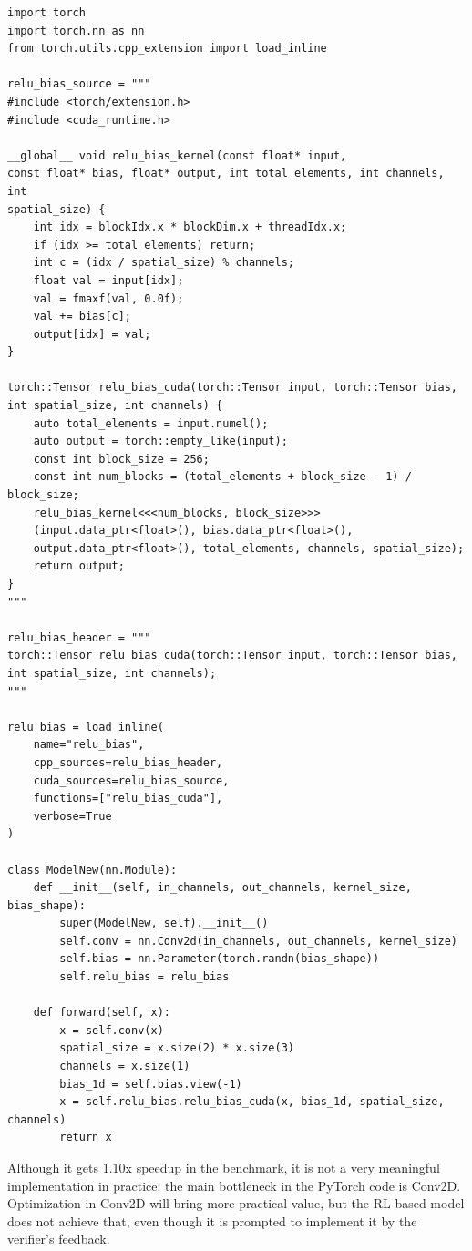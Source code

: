 \begin{tcolorbox}[mybox, title={Level 2 Task 1 — Reported $1.05\times$ Speedup}]
\ttfamily
\tiny
\begin{verbatim}
import torch
import torch.nn as nn
from torch.utils.cpp_extension import load_inline

relu_bias_source = """
#include <torch/extension.h>
#include <cuda_runtime.h>

__global__ void relu_bias_kernel(const float* input, 
const float* bias, float* output, int total_elements, int channels, int 
spatial_size) {
    int idx = blockIdx.x * blockDim.x + threadIdx.x;
    if (idx >= total_elements) return;
    int c = (idx / spatial_size) % channels;
    float val = input[idx];
    val = fmaxf(val, 0.0f);
    val += bias[c];
    output[idx] = val;
}

torch::Tensor relu_bias_cuda(torch::Tensor input, torch::Tensor bias, 
int spatial_size, int channels) {
    auto total_elements = input.numel();
    auto output = torch::empty_like(input);
    const int block_size = 256;
    const int num_blocks = (total_elements + block_size - 1) / block_size;
    relu_bias_kernel<<<num_blocks, block_size>>>
    (input.data_ptr<float>(), bias.data_ptr<float>(), 
    output.data_ptr<float>(), total_elements, channels, spatial_size);
    return output;
}
"""

relu_bias_header = """
torch::Tensor relu_bias_cuda(torch::Tensor input, torch::Tensor bias, 
int spatial_size, int channels);
"""

relu_bias = load_inline(
    name="relu_bias",
    cpp_sources=relu_bias_header,
    cuda_sources=relu_bias_source,
    functions=["relu_bias_cuda"],
    verbose=True
)

class ModelNew(nn.Module):
    def __init__(self, in_channels, out_channels, kernel_size, bias_shape):
        super(ModelNew, self).__init__()
        self.conv = nn.Conv2d(in_channels, out_channels, kernel_size)
        self.bias = nn.Parameter(torch.randn(bias_shape))
        self.relu_bias = relu_bias

    def forward(self, x):
        x = self.conv(x)
        spatial_size = x.size(2) * x.size(3)
        channels = x.size(1)
        bias_1d = self.bias.view(-1)
        x = self.relu_bias.relu_bias_cuda(x, bias_1d, spatial_size, channels)
        return x
\end{verbatim}
\normalfont
\end{tcolorbox}

Although it gets 1.10x speedup in the benchmark, it is not a very meaningful implementation in practice: the main bottleneck in the PyTorch code is Conv2D. Optimization in Conv2D will bring more practical value, but the RL-based model does not achieve that, even though it is prompted to implement it by the verifier's feedback.

